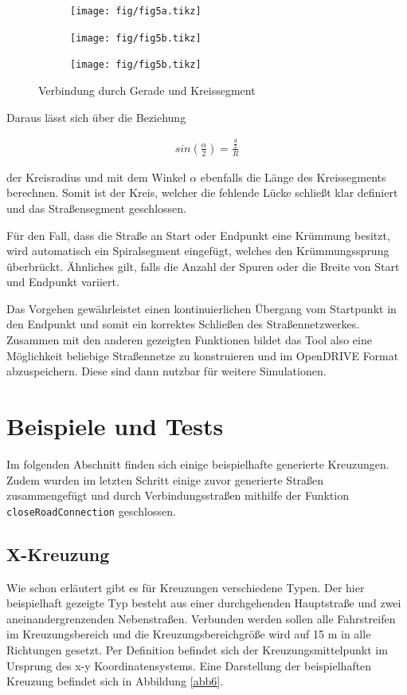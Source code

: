 \begin{figure}[H]
\flushleft
\begin{subfigure}{0.32\textwidth}
\texttt{[image: fig/fig5a.tikz]}
\end{subfigure}
\begin{subfigure}{0.32\textwidth}
    \texttt{[image: fig/fig5b.tikz]}
\end{subfigure}
\begin{subfigure}{0.32\textwidth}
    \texttt{[image: fig/fig5b.tikz]}
\end{subfigure}
\caption{Verbindung durch Gerade und Kreissegment}
\label{abb5}
\end{figure}

Daraus lässt sich über die Beziehung

\begin{align}
sin(\frac{\alpha}{2}) = \frac{\frac{d}{2}}{R}
\end{align}

der Kreisradius und mit dem Winkel \(\alpha\) ebenfalls die Länge des Kreissegments berechnen. Somit ist der Kreis, welcher die fehlende Lücke schließt klar definiert und das Straßensegment geschlossen.

Für den Fall, dass die Straße an Start oder Endpunkt eine Krümmung besitzt, wird automatisch ein Spiralsegment eingefügt, welches den Krümmungssprung überbrückt. Ähnliches gilt, falls die Anzahl der Spuren oder die Breite von Start und Endpunkt variiert.

Das Vorgehen gewährleistet einen kontinuierlichen Übergang vom Startpunkt in den Endpunkt und somit ein korrektes Schließen des Straßennetzwerkes. Zusammen mit den anderen gezeigten Funktionen bildet das Tool also eine Möglichkeit beliebige Straßennetze zu konstruieren und im OpenDRIVE Format abzuspeichern. Diese sind dann nutzbar für weitere Simulationen.

\chapter{Beispiele und Tests}

Im folgenden Abschnitt finden sich einige beispielhafte generierte Kreuzungen. Zudem wurden im letzten Schritt einige zuvor generierte Straßen zusammengefügt und durch Verbindungsstraßen mithilfe der Funktion \texttt{closeRoadConnection} geschlossen.

\section{X-Kreuzung}
Wie schon erläutert gibt es für Kreuzungen verschiedene Typen. Der hier beispielhaft gezeigte Typ besteht aus einer durchgehenden Hauptstraße und zwei aneinandergrenzenden Nebenstraßen. Verbunden werden sollen alle Fahrstreifen im Kreuzungsbereich und die Kreuzungsbereichgröße wird auf 15 m in alle Richtungen gesetzt. Per Definition befindet sich der Kreuzungsmittelpunkt im Ursprung des x-y Koordinatensystems. Eine Darstellung der beispielhaften Kreuzung befindet sich in Abbildung \ref{abb6}.

